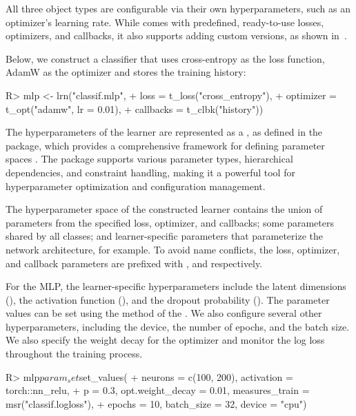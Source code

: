 \documentclass[article]{jss}
\theoremstyle{definition}
\begin{document}
All three object types are configurable via their own hyperparameters, such as an optimizer's learning rate.
While  comes with predefined, ready-to-use losses, optimizers, and callbacks, it also supports adding custom versions, as shown in~.

Below, we construct a  classifier that uses cross-entropy as the loss function, AdamW as the optimizer \citep{ref-loshchilov2017decoupled} and stores the training history:

\begin{CodeInput}
R> mlp <- lrn("classif.mlp",
+   loss = t_loss("cross_entropy"),
+   optimizer = t_opt("adamw", lr = 0.01),
+   callbacks = t_clbk("history"))
\end{CodeInput}

The hyperparameters of the learner are represented as a , as defined in the  package, which provides a comprehensive framework for defining parameter spaces \citep{ref-paradox2024}.
The package supports various parameter types, hierarchical dependencies, and constraint handling, making it a powerful tool for hyperparameter optimization and configuration management.

The hyperparameter space of the constructed learner contains the union of parameters from the specified loss, optimizer, and callbacks; some parameters shared by all  classes; and learner-specific parameters that parameterize the network architecture, for example.
To avoid name conflicts, the loss, optimizer, and callback parameters are prefixed with ,  and  respectively.

For the MLP, the learner-specific hyperparameters include the latent dimensions (), the activation function (), and the dropout probability ().
The parameter values can be set using the  method of the .
We also configure several other hyperparameters, including the device, the number of epochs, and the batch size.
We also specify the weight decay for the optimizer and monitor the log loss throughout the training process.

\begin{CodeInput}
R> mlp$param_set$set_values(
+    neurons = c(100, 200), activation = torch::nn_relu,
+    p = 0.3, opt.weight_decay = 0.01, measures_train = msr("classif.logloss"),
+    epochs = 10, batch_size = 32, device = "cpu")
\end{CodeInput}
\end{document}
